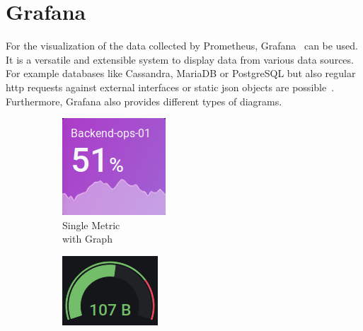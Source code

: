 \section{Grafana}
\label{sec:grafana}
For the visualization of the data collected by Prometheus, Grafana~\citep{GrafanaHomepage} can be used. It is a versatile and extensible system to display data from various data sources. For example databases like Cassandra, MariaDB or PostgreSQL but also regular \gls{http} requests against external interfaces or static \gls{json} objects are possible~\cite{GrafanaDataSources}. Furthermore, Grafana also provides different types of diagrams.
\begin{figure}[ht]
	\begin{subfigure}{.25\textwidth}
		\centering
		\includegraphics[width=.8\linewidth]{assets/screenshots/Screenshot_2020-12-08 1 - New Features in v7 0 - Grafana.png}
		\captionsetup{justification=centering}
		\caption{Single Metric\\with Graph}
		\label{fig:sfig1}
	\end{subfigure}%
	\begin{subfigure}{.25\textwidth}
		\centering
		\includegraphics[width=.8\linewidth]{assets/screenshots/Screenshot_2020-12-08 Website trends - Grafana.png}

\end{subfigure}
\end{figure}
